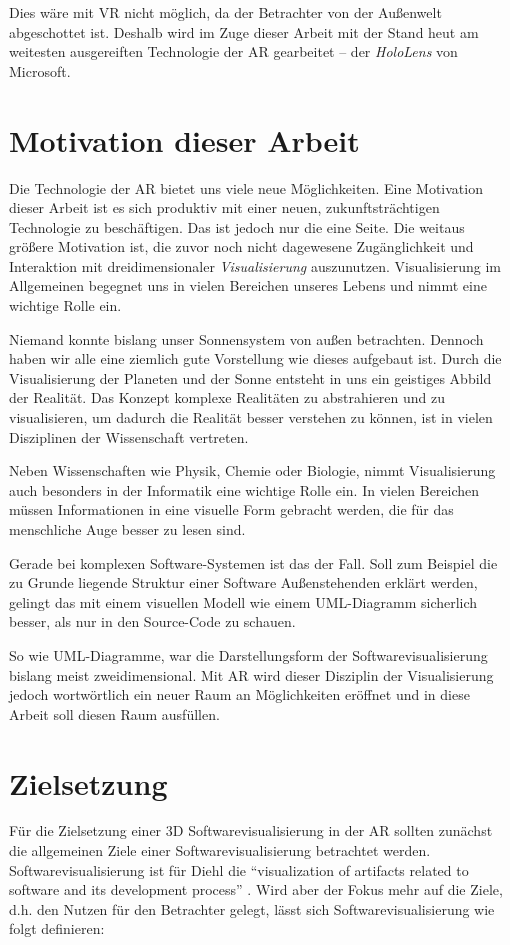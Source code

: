 Dies wäre mit VR nicht möglich, da der Betrachter von der Außenwelt abgeschottet ist. Deshalb wird im Zuge dieser Arbeit mit der Stand heut am weitesten ausgereiften Technologie der AR gearbeitet -- der \emph{HoloLens} von Microsoft.

\section{Motivation dieser Arbeit}
Die Technologie der AR bietet uns viele neue Möglichkeiten. Eine Motivation dieser Arbeit ist es sich produktiv mit einer neuen, zukunftsträchtigen Technologie zu beschäftigen. Das ist jedoch nur die eine Seite. Die weitaus größere Motivation ist, die zuvor noch nicht dagewesene Zugänglichkeit und Interaktion mit dreidimensionaler \emph{Visualisierung} auszunutzen. Visualisierung im Allgemeinen begegnet uns in vielen Bereichen unseres Lebens und nimmt eine wichtige Rolle ein.

Niemand konnte bislang unser Sonnensystem von außen betrachten. Dennoch haben wir alle eine ziemlich gute Vorstellung wie dieses aufgebaut ist. Durch die Visualisierung der Planeten und der Sonne entsteht in uns ein geistiges Abbild der Realität. Das Konzept komplexe Realitäten zu abstrahieren und zu visualisieren, um dadurch die Realität besser verstehen zu können, ist in vielen Disziplinen der Wissenschaft vertreten.

Neben Wissenschaften wie Physik, Chemie oder Biologie, nimmt Visualisierung
auch besonders in der Informatik eine wichtige Rolle ein. In vielen Bereichen müssen Informationen in eine visuelle Form gebracht werden, die für das menschliche Auge besser zu lesen sind.

Gerade bei komplexen Software-Systemen ist das der Fall. Soll zum Beispiel die zu Grunde liegende Struktur einer Software Außenstehenden erklärt werden, gelingt das mit einem visuellen Modell wie einem UML-Diagramm sicherlich besser, als nur in den Source-Code zu schauen.

So wie UML-Diagramme, war die Darstellungsform der Softwarevisualisierung bislang meist zweidimensional. Mit AR wird dieser Disziplin der Visualisierung jedoch wortwörtlich ein neuer Raum an Möglichkeiten eröffnet und in diese Arbeit soll diesen Raum ausfüllen.

\section{Zielsetzung}
Für die Zielsetzung einer 3D Softwarevisualisierung in der AR sollten zunächst die allgemeinen Ziele einer Softwarevisualisierung betrachtet werden. Softwarevisualisierung ist für Diehl die "`visualization of artifacts related to software and its development process"' \cite{diehl2007software}. Wird aber der Fokus mehr auf die Ziele, d.h. den Nutzen für den Betrachter gelegt, lässt sich Softwarevisualisierung wie folgt definieren:

